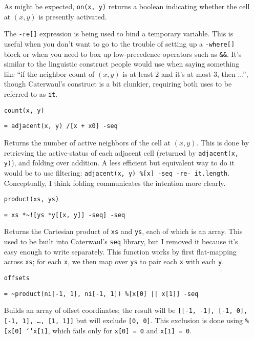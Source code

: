 \documentclass{report}
\begin{document}
\begin{enumerate}
  As might be expected, {\tt on(x, y)} returns a boolean indicating whether the cell at $(x, y)$ is presently activated.

  The {\tt -re[]} expression is being used to bind a temporary variable. This is useful when you don't want to go to the trouble of setting up a {\tt -where[]} block or when you need
  to box up low-precedence operators such as {\tt \&\&}. It's similar to the linguistic construct people would use when saying something like ``if the neighbor count of $(x, y)$ is at
  least 2 and it's at most 3, then ...'', though Caterwaul's construct is a bit clunkier, requiring both uses to be referred to as {\tt it}.

\item[{\tt count(x, y)}]
\begin{verbatim}
= adjacent(x, y) /[x + x0] -seq
\end{verbatim}

  Returns the number of active neighbors of the cell at $(x, y)$. This is done by retrieving the active-status of each adjacent cell (returned by {\tt adjacent(x, y)}), and folding
  over addition. A less efficient but equivalent way to do it would be to use filtering: \verb|adjacent(x, y) %[x] -seq -re- it.length|. Conceptually, I think folding communicates the
  intention more clearly.

\item[{\tt product(xs, ys)}]
\begin{verbatim}
= xs *~![ys *y[[x, y]] -seq] -seq
\end{verbatim}

  Returns the Cartesian product of {\tt xs} and {\tt ys}, each of which is an array. This used to be built into Caterwaul's {\tt seq} library, but I removed it because it's easy enough
  to write separately. This function works by first flat-mapping across {\tt xs}; for each {\tt x}, we then map over {\tt ys} to pair each {\tt x} with each {\tt y}.

\item[{\tt offsets}]
\begin{verbatim}
= ~product(ni[-1, 1], ni[-1, 1]) %[x[0] || x[1]] -seq
\end{verbatim}

  Builds an array of offset coordinates; the result will be {\tt [[-1, -1], [-1, 0], [-1, 1], \dots, [1, 1]]} but will exclude {\tt [0, 0]}. This exclusion is done using {\tt \%[x[0]
  \char `\| \char `\| x[1]}, which fails only for {\tt x[0] = 0} and {\tt x[1] = 0}.


\end{enumerate}
\end{document}
